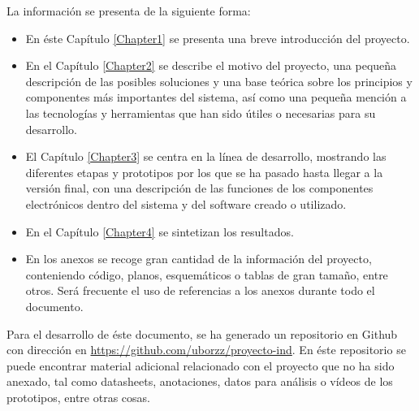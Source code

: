 La información se presenta de la siguiente forma:

\begin{itemize}
  \item En éste Capítulo \ref{Chapter1} se presenta una breve introducción del proyecto.
  \item En el Capítulo \ref{Chapter2} se describe el motivo del proyecto, una pequeña descripción de las posibles soluciones y una base teórica sobre los principios y componentes más importantes del sistema, así como una pequeña mención a las tecnologías y herramientas que han sido útiles o necesarias para su desarrollo.
  \item El Capítulo \ref{Chapter3} se centra en la línea de desarrollo, mostrando las diferentes etapas y prototipos por los que se ha pasado hasta llegar a la versión final, con una descripción de las funciones de los componentes electrónicos dentro del sistema y del software creado o utilizado.
  \item En el Capítulo \ref{Chapter4} se sintetizan los resultados.
  \item En los anexos se recoge gran cantidad de la información del proyecto, conteniendo código, planos, esquemáticos o tablas de gran tamaño, entre otros. Será frecuente el uso de referencias a los anexos durante todo el documento.
\end{itemize}

Para el desarrollo de éste documento, se ha generado un repositorio en Github con dirección en \url{https://github.com/uborzz/proyecto-ind}. En éste repositorio se puede encontrar material adicional relacionado con el proyecto que no ha sido anexado, tal como datasheets, anotaciones, datos para análisis o vídeos de los prototipos, entre otras cosas. 
